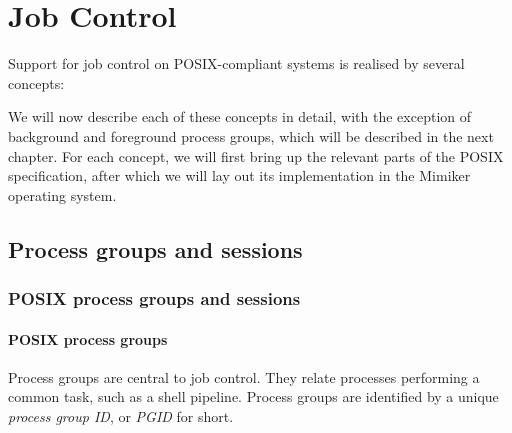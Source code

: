 \documentclass[shortabstract, manyadvisors, english, mgr]{iithesis}
\begin{document}
\chapter{Job Control}

Support for job control on POSIX-compliant systems is realised by several
concepts:

We will now describe each of these concepts in detail, with the exception of
background and foreground process groups, which will be described in the next chapter.
For each concept, we will first bring up the relevant parts of the POSIX
specification, after which we will lay out its implementation in the Mimiker
operating system.

\section{Process groups and sessions}

\subsection{POSIX process groups and sessions}
\label{chap:posix-groups-sessions}

\subsubsection{POSIX process groups}

Process groups are central to job control. They relate processes performing a
common task, such as a shell pipeline. Process groups are identified by a unique
\textit{process group ID}, or \textit{PGID} for short.
\end{document}
